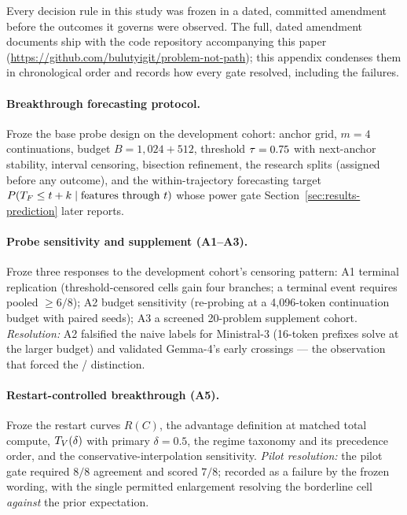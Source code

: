 
Every decision rule in this study was frozen in a dated, committed
amendment before the outcomes it governs were observed. The full, dated
amendment documents ship with the code repository accompanying this
paper (\url{https://github.com/bulutyigit/problem-not-path});
this appendix condenses them in chronological order and records
how every gate resolved, including the failures.

\paragraph{Breakthrough forecasting protocol.}
Froze the base probe design on the development cohort: anchor grid,
$m = 4$ continuations, budget $B = 1{,}024 + 512$, threshold
$\tau = 0.75$ with next-anchor stability, interval censoring, bisection
refinement, the research splits (assigned before any outcome), and the
within-trajectory forecasting target
$P(T_F \le t + k \mid \text{features through } t)$ whose power gate
Section~\ref{sec:results-prediction} later reports.

\paragraph{Probe sensitivity and supplement (A1--A3).}
Froze three responses to the development cohort's censoring pattern:
A1 terminal replication (threshold-censored cells gain four branches; a
terminal event requires pooled $\ge 6/8$); A2 budget sensitivity
(re-probing at a 4{,}096-token continuation budget with paired seeds); A3
a screened 20-problem supplement cohort. \emph{Resolution:} A2 falsified
the naive labels for Ministral-3 (16-token prefixes solve at the larger
budget) and validated Gemma-4's early crossings --- the observation that
forced the \Tf/\Tv{} distinction.

\paragraph{Restart-controlled breakthrough (A5).}
Froze the restart curves $R(C)$, the advantage definition at matched total
compute, $T_V(\delta)$ with primary $\delta = 0.5$, the regime taxonomy
and its precedence order, and the conservative-interpolation sensitivity.
\emph{Pilot resolution:} the pilot gate required $8/8$ agreement and
scored $7/8$; recorded as a failure by the frozen wording, with the single
permitted enlargement resolving the borderline cell \emph{against} the
prior expectation.

